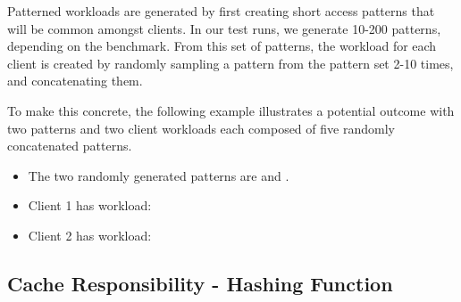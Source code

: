 \documentclass[sigconf]{acmart}
\begin{document}
Patterned workloads are generated by first creating short access patterns that will be common amongst clients. In our test runs, we generate 10-200 patterns, depending on the benchmark. From this set of patterns, the workload for each client is created by randomly sampling a pattern from the pattern set 2-10 times, and concatenating them. 


To make this concrete, the following example illustrates a potential outcome with two patterns and two client workloads each composed of five randomly concatenated patterns.
\begin{itemize}
    \item The two randomly generated patterns are {} and {}.
    \item Client 1 has workload: {}
    \item Client 2 has workload: {}
\end{itemize}

\subsection{Cache Responsibility - Hashing Function}
\label{sec:hash}
\end{document}
